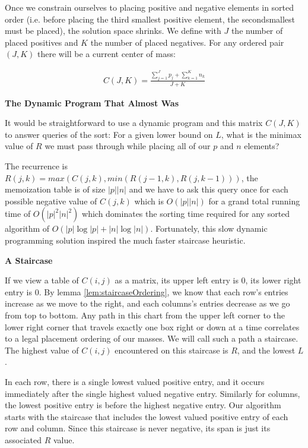 \documentclass[11pt,twocolumn]{article}
\begin{document}
Once we constrain ourselves to placing positive and negative elements in sorted order (i.e. before placing the third smallest positive element, the secondsmallest must be placed), the solution space shrinks.  We define with $J$ the number of placed positives and $K$ the number of placed negatives. For any ordered pair $(J,K)$ there will be a current center of mass:

\begin{align*} 
C(J,K) = \frac{\sum_{j=1}^{J} p_j + \sum_{k=1}^{K} n_k }{J+K}
\end{align*}

\textbf{The Dynamic Program That Almost Was}

It would be straightforward to use a dynamic program and this matrix $C(J,K)$ to answer queries of the sort: For a given lower bound on $L$, what is the minimax value of $R$ we must pass through while placing all of our $p$ and $n$ elements?

The recurrence is $R(j,k) = max( C(j,k), min( R(j-1,k), R(j,k-1) ) )$, the memoization table is of size $|p||n|$ and we have to ask this query once for each possible negative value of $C(j,k)$ which is $O(|p||n|)$ for a grand total running time of $O(|p|^2 |n|^2)$ which dominates the sorting time required for any sorted algorithm of $O(|p| \log |p| + |n| \log |n|)$.  Fortunately, this slow dynamic programming solution inspired the much faster staircase heuristic.

\textbf{A Staircase}

If we view a table of $C(i,j)$ as a matrix, its upper left entry is $0$, its lower right entry is $0$.  By lemma \ref{lem:staircaseOrdering}, we know that each row's entries increase as we move to the right, and each columns's entries decrease as we go from top to bottom.  Any path in this chart from the upper left corner to the lower right corner that travels exactly one box right or down at a time correlates to a legal placement ordering of our masses.  We will call such a path a staircase. The highest value of $C(i,j)$ encountered on this staircase is $R$, and the lowest $L$.  

In each row, there is a single lowest valued positive entry, and it occurs immediately after the single highest valued negative entry.  Similarly for columns, the lowest positive entry is before the highest negative entry.  Our algorithm starts with the staircase that includes the lowest valued positive entry of each row and column.  Since this staircase is never negative, its span is just its associated $R$ value.
\end{document}
